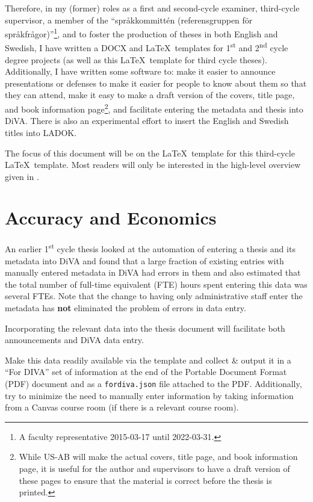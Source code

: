 \documentclass[12pt, twoside]{article}
\newcommand{\fname}[1]{\texttt{#1}}
\begin{document}
Therefore, in my (former) roles as a first and second-cycle examiner, third-cycle supervisor, a member of the “\foreignlanguage{swedish}{språkkommittén (referensgruppen för språkfrågor})”\footnote{A faculty representative 2015-03-17 until 2022-03-31.}, and to foster the production of theses in both English and Swedish, I have written a DOCX and \LaTeX~templates for 1\textsuperscript{st} and 2\textsuperscript{nd} cycle degree projects (as well as this \LaTeX~template for third cycle theses). Additionally, I have written some software to: \first make it easier to announce presentations or defenses to make it easier for people to know about them so that they can attend, \Second make it easy to make a draft version of the covers, title page, and book information page\footnote{While US-AB will make the actual covers, title page, and book information page, it is useful for the author and supervisors to have a draft version of these pages to ensure that the material is correct before the thesis is printed.}, and \third facilitate entering the metadata and thesis into DiVA. There is also an experimental effort to insert the English and Swedish titles into LADOK.

The focus of this document will be on the \LaTeX\  template for this third-cycle \LaTeX{}~template. 
Most readers will only be interested in the high-level overview given in .


\section{Accuracy and Economics}
\label{sec:accuracyAndEconomics}

An earlier 1\textsuperscript{st} cycle thesis looked at the automation of entering a thesis and its metadata into DiVA and found that a large fraction of existing entries with manually entered metadata in DiVA had errors in them and also estimated that the total number of full-time equivalent (FTE) hours spent entering this data was several FTEs\cite{BesharatPour_and_Li_2019}. Note that the change to having only administrative staff enter the metadata has \textbf{not} eliminated the problem of errors in data entry.
\begin{description}[labelwidth =\widthof{\textbf{Hypothesis}}, leftmargin = !]
\item[Hypothesis] Incorporating the relevant data into the thesis document will facilitate both announcements and DiVA data entry.

\item[Approach] Make this data readily available via the template and collect \& output it in a 
“For DIVA” set of information at the end of the Portable Document Format (PDF) document and as a \fname{fordiva.json} file attached to the PDF. Additionally, try to minimize the need to manually enter information by taking information from a Canvas course room (if there is a relevant course room).
\end{description}
\end{document}
